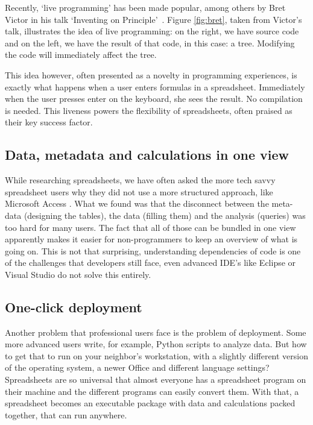 \documentclass[conference]{IEEEtran}
\begin{document}
Recently, ‘live programming’ has been made popular, among others by Bret Victor in his talk `Inventing on Principle'~\cite{Victor2012}. 
Figure \ref{fig:bret}, taken from Victor's talk, illustrates the idea of live programming: on the right, we have source code and on the left, we have the result of that code, in this case: a tree. Modifying the code will immediately affect the tree.
 
This idea however, often presented as a novelty in programming experiences, is exactly what happens when a user enters formulas in a spreadsheet. Immediately when the user presses enter on the keyboard, she sees the result. No compilation is needed. This liveness powers the flexibility of spreadsheets, often praised as their key success factor.

\subsection{Data, metadata and calculations in one view}
While researching spreadsheets, we have often asked the more tech savvy spreadsheet users why they did not use a more structured approach, like Microsoft Access  . What we found was that the disconnect between the meta-data (designing the tables), the data (filling them) and the analysis (queries) was too hard for many users. The fact that all of those can be bundled in one view apparently makes it easier for non-programmers to keep an overview of what is going on. This is not that surprising, understanding dependencies of code is one of the challenges that developers still face, even advanced IDE's like Eclipse or Visual Studio do not solve this entirely. 

\subsection{One-click deployment}
Another problem that professional users face is the problem of deployment. Some more advanced users write, for example, Python scripts to analyze data. But how to get that to run on your neighbor's workstation, with a slightly different version of the operating system, a newer Office and different language settings? Spreadsheets are so universal that almost everyone has a spreadsheet program on their machine and the different programs can easily convert them. With that, a spreadsheet becomes an executable package with data and calculations packed together, that can run anywhere.
\end{document}
